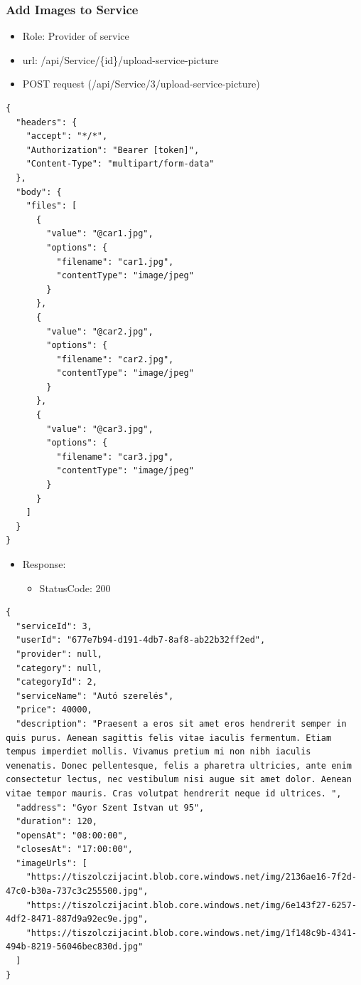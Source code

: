 \documentclass[11pt]{article}
\begin{document}
\subsubsection{Add Images to Service}
\label{sec:org7003a1e}
\begin{itemize}
\item Role: Provider of service
\item url: /api/Service/\{id\}/upload-service-picture
\item POST request (/api/Service/3/upload-service-picture)
\end{itemize}
\begin{verbatim}
{
  "headers": {
    "accept": "*/*",
    "Authorization": "Bearer [token]",
    "Content-Type": "multipart/form-data"
  },
  "body": {
    "files": [
      {
        "value": "@car1.jpg",
        "options": {
          "filename": "car1.jpg",
          "contentType": "image/jpeg"
        }
      },
      {
        "value": "@car2.jpg",
        "options": {
          "filename": "car2.jpg",
          "contentType": "image/jpeg"
        }
      },
      {
        "value": "@car3.jpg",
        "options": {
          "filename": "car3.jpg",
          "contentType": "image/jpeg"
        }
      }
    ]
  }
}

\end{verbatim}
\begin{itemize}
\item Response:
\begin{itemize}
\item StatusCode: 200
\end{itemize}
\end{itemize}
\begin{verbatim}
{
  "serviceId": 3,
  "userId": "677e7b94-d191-4db7-8af8-ab22b32ff2ed",
  "provider": null,
  "category": null,
  "categoryId": 2,
  "serviceName": "Autó szerelés",
  "price": 40000,
  "description": "Praesent a eros sit amet eros hendrerit semper in quis purus. Aenean sagittis felis vitae iaculis fermentum. Etiam tempus imperdiet mollis. Vivamus pretium mi non nibh iaculis venenatis. Donec pellentesque, felis a pharetra ultricies, ante enim consectetur lectus, nec vestibulum nisi augue sit amet dolor. Aenean vitae tempor mauris. Cras volutpat hendrerit neque id ultrices. ",
  "address": "Gyor Szent Istvan ut 95",
  "duration": 120,
  "opensAt": "08:00:00",
  "closesAt": "17:00:00",
  "imageUrls": [
    "https://tiszolczijacint.blob.core.windows.net/img/2136ae16-7f2d-47c0-b30a-737c3c255500.jpg",
    "https://tiszolczijacint.blob.core.windows.net/img/6e143f27-6257-4df2-8471-887d9a92ec9e.jpg",
    "https://tiszolczijacint.blob.core.windows.net/img/1f148c9b-4341-494b-8219-56046bec830d.jpg"
  ]
}
\end{verbatim}
\end{document}
